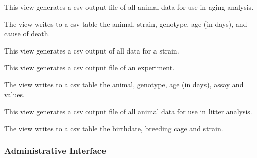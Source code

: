 \documentclass[letterpaper,10pt,english]{sphinxmanual}
\begin{document}

\begin{fulllineitems}
\label{data:mousedb.data.views.aging_csv}
This view generates a csv output file of all animal data for use in aging analysis.

The view writes to a csv table the animal, strain, genotype, age (in days), and cause of death.

\end{fulllineitems}


\begin{fulllineitems}
\label{data:mousedb.data.views.all_data_csv}
This view generates a csv output of all data for a strain.

\end{fulllineitems}


\begin{fulllineitems}
\label{data:mousedb.data.views.experiment_details_csv}
This view generates a csv output file of an experiment.

The view writes to a csv table the animal, genotype, age (in days), assay and values.

\end{fulllineitems}


\begin{fulllineitems}
\label{data:mousedb.data.views.litters_csv}
This view generates a csv output file of all animal data for use in litter analysis.

The view writes to a csv table the birthdate, breeding cage and strain.

\end{fulllineitems}



\subsubsection{Administrative Interface}
\label{data:module-mousedb.data.admin}\label{data:administrative-interface}
\end{document}
